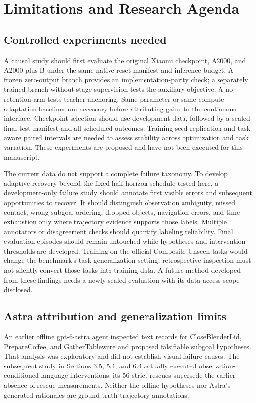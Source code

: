 \documentclass[10pt,twocolumn,letterpaper]{article}
\begin{document}
\section{Limitations and Research Agenda}

\subsection{Controlled experiments needed}

A causal study should first evaluate the original Xiaomi checkpoint, A2000, and A2000 plus B under the same native-reset manifest and inference budget. A frozen zero-output branch provides an implementation-parity check; a separately trained branch without stage supervision tests the auxiliary objective. A no-retention arm tests teacher anchoring. Same-parameter or same-compute adaptation baselines are necessary before attributing gains to the continuous interface. Checkpoint selection should use development data, followed by a sealed final test manifest and all scheduled outcomes. Training-seed replication and task-aware paired intervals are needed to assess stability across optimization and task variation. These experiments are proposed and have not been executed for this manuscript.


The current data do not support a complete failure taxonomy. To develop adaptive recovery beyond the fixed half-horizon schedule tested here, a development-only failure study should annotate first visible errors and subsequent opportunities to recover. It should distinguish observation ambiguity, missed contact, wrong subgoal ordering, dropped objects, navigation errors, and time exhaustion only where trajectory evidence supports those labels. Multiple annotators or disagreement checks should quantify labeling reliability. Final evaluation episodes should remain untouched while hypotheses and intervention thresholds are developed. Training on the official Composite-Unseen tasks would change the benchmark's task-generalization setting; retrospective inspection must not silently convert those tasks into training data. A future method developed from these findings needs a newly sealed evaluation with its data-access scope disclosed.


\subsection{Astra attribution and generalization limits}

An earlier offline gpt-6-astra agent inspected text records for CloseBlenderLid, PrepareCoffee, and GatherTableware and proposed falsifiable subgoal hypotheses. That analysis was exploratory and did not establish visual failure causes. The subsequent study in Sections 3.5, 5.4, and 6.4 actually executed observation-conditioned language interventions; its 56 strict rescues supersede the earlier absence of rescue measurements. Neither the offline hypotheses nor Astra's generated rationales are ground-truth trajectory annotations.
\end{document}
